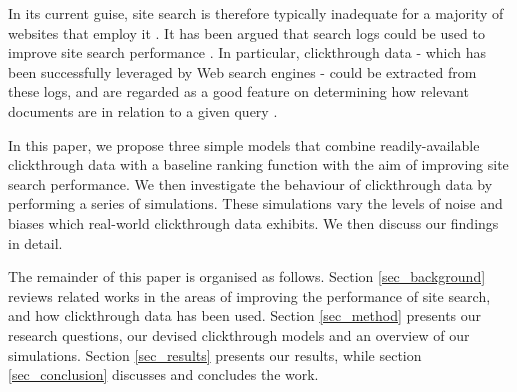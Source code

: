 In its current guise, site search is therefore typically inadequate for a majority of websites that employ it \cite{ding2007log_based_site_search, xue2002log_mining}. It has been argued that search logs could be used to improve site search performance \cite{guo2009click_chain, joachims2002optimizing_clickthrough}. In particular, clickthrough data - which has been successfully leveraged by Web search engines - could be extracted from these logs, and are regarded as a good feature on determining how relevant documents are in relation to a given query \cite{joachims2005clickthrough}.

In this paper, we propose three simple models that combine readily-available clickthrough data with a baseline ranking function with the aim of improving site search performance. We then investigate the behaviour of clickthrough data by performing a series of simulations. These simulations vary the levels of noise and biases which real-world clickthrough data exhibits. We then discuss our findings in detail.

The remainder of this paper is organised as follows. Section \ref{sec_background} reviews related works in the areas of improving the performance of site search, and how clickthrough data has been used. Section \ref{sec_method} presents our research questions, our devised clickthrough models and an overview of our simulations. Section \ref{sec_results} presents our results, while section \ref{sec_conclusion} discusses and concludes the work.
